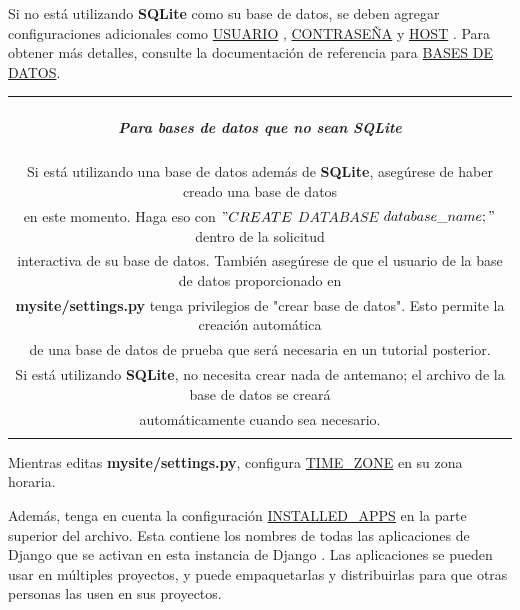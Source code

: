 \documentclass[10pt]{article}
\newcommand{\django}[1]{{\textcolor{G}{Django} #1}}
\begin{document}
Si no está utilizando \textbf{SQLite} como su base de datos, se deben agregar configuraciones adicionales como \textcolor {B}{\href{https://docs.djangoproject.com/en/3.0/ref/settings/\#std:setting-USER}{USUARIO}}
, \textcolor {B}{\href{https://docs.djangoproject.com/en/3.0/ref/settings/\#std:setting-PASSWORD}{CONTRASEÑA}}
 y \textcolor {B}{\href{https://docs.djangoproject.com/en/3.0/ref/settings/\#std:setting-HOST}{HOST}}
. Para obtener más detalles, consulte la documentación de referencia para \textcolor {B}{\href{https://docs.djangoproject.com/en/3.0/ref/settings/\#std:setting-DATABASES}{BASES DE DATOS}}.

\begin{table}[H]
	\begin{tabular}{||c||}
	\hline \\
	\begin{Large}
	\textbf{\textit{Para bases de datos que no sean SQLite}}
	\end{Large}
	\\\\		
Si está utilizando una base de datos además de \textbf{SQLite}, asegúrese de haber creado una base de datos\\ en este momento. Haga eso con \textcolor{G}{$"CREATE$ $DATABASE$ $database\_name;"$} dentro de la solicitud \\interactiva de su base de datos.
También asegúrese de que el usuario de la base de datos proporcionado en\\ \textbf{mysite/settings.py} tenga privilegios de "crear base de datos". Esto permite la creación automática\\ de una base de datos de prueba que será necesaria en un tutorial posterior.\\
Si está utilizando \textbf{SQLite}, no necesita crear nada de antemano; el archivo de la base de datos se creará\\ automáticamente cuando sea necesario.
\\\\ \hline 	
			\end{tabular}
		\end{table}		


Mientras editas \textbf{mysite/settings.py}, configura {\textcolor{B}{\href{https://docs.djangoproject.com/en/3.0/ref/settings/\#std:setting-TIME\_ZONE}{TIME\_ZONE}}}
 en su zona horaria.

Además, tenga en cuenta la configuración {\textcolor{B}{\href{https://docs.djangoproject.com/en/3.0/ref/settings/\#std:setting-INSTALLED\_APPS}{INSTALLED\_APPS}}}
 en la parte superior del archivo. Esta contiene los nombres de todas las aplicaciones de \django{} que se activan en esta instancia de \django{}. Las aplicaciones se pueden usar en múltiples proyectos, y puede empaquetarlas y distribuirlas para que otras personas las usen en sus proyectos.
\end{document}
